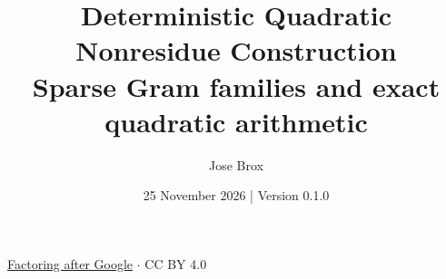 
\title{Deterministic Quadratic Nonresidue Construction\\[0.4em]\large Sparse Gram families and exact quadratic arithmetic}
\renewcommand{\paperrunningtitle}{Quadratic nonresidue construction}
\author{Jose Brox}
\date{25 November 2026 \quad | \quad Version 0.1.0}

\maketitle
\begin{center}\small\href{https://github.com/JoseBrox/Factoring_after_Google}{Factoring after Google} $\cdot$ CC BY 4.0\end{center}

\clearpage



